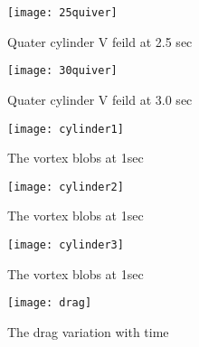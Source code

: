 \documentclass[12pt]{article}
\begin{document}
\begin{figure}
\centering
\begin{minipage}{.5\textwidth}
  \centering
  \texttt{[image: 25quiver]}
  \captionsetup{width=0.8\textwidth}
  \caption{Quater cylinder V feild at 2.5 sec} 
\end{minipage}%
\begin{minipage}{.5\textwidth}
  \centering
  \texttt{[image: 30quiver]}
  \captionsetup{width=0.8\textwidth}
  \caption{Quater cylinder V feild at 3.0 sec} 
\end{minipage}
\end{figure}

\begin{figure}
    \centering
    \texttt{[image: cylinder1]}
    \caption{The vortex blobs at 1sec} 
\end{figure}
\begin{figure}
    \centering
    \texttt{[image: cylinder2]}
    \caption{The vortex blobs at 1sec} 
\end{figure}
\begin{figure}
    \centering
    \texttt{[image: cylinder3]}
    \caption{The vortex blobs at 1sec} 
\end{figure}





\begin{figure}
    \centering
    \texttt{[image: drag]}
    \caption{The drag variation with time} 
\end{figure}
\end{document}
